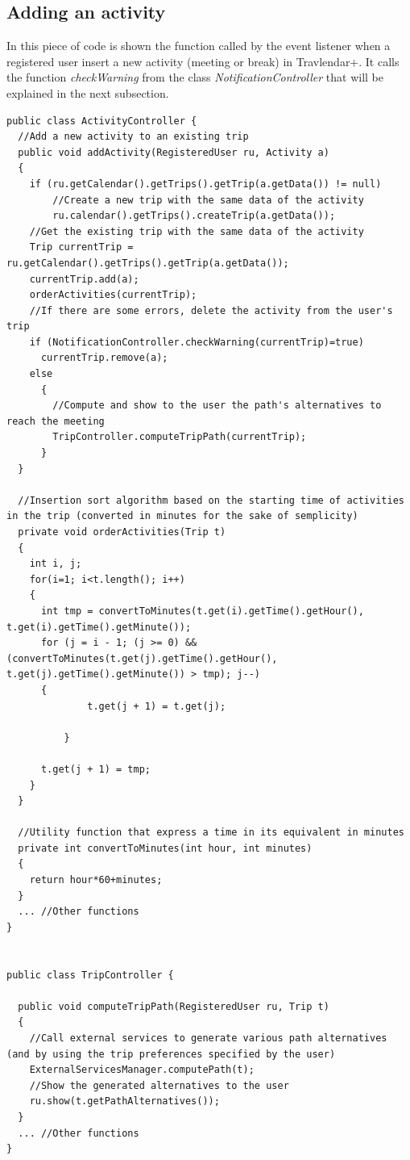 \documentclass[12pt,titlepage]{article}
\begin{document}
\subsection{Adding an activity} 
In this piece of code is shown the function called by the event listener when a registered user insert a new activity (meeting or break) in Travlendar+. It calls the function \textit{checkWarning} from the class \textit{NotificationController} that will be explained in the next subsection. 
\begin{lstlisting} 
public class ActivityController { 
  //Add a new activity to an existing trip 
  public void addActivity(RegisteredUser ru, Activity a) 
  { 
    if (ru.getCalendar().getTrips().getTrip(a.getData()) != null) 
        //Create a new trip with the same data of the activity 
        ru.calendar().getTrips().createTrip(a.getData());  
    //Get the existing trip with the same data of the activity 
    Trip currentTrip = ru.getCalendar().getTrips().getTrip(a.getData());  
    currentTrip.add(a); 
    orderActivities(currentTrip); 
    //If there are some errors, delete the activity from the user's trip 
    if (NotificationController.checkWarning(currentTrip)=true)  
      currentTrip.remove(a); 
    else  
      { 
        //Compute and show to the user the path's alternatives to reach the meeting 
        TripController.computeTripPath(currentTrip);  
      } 
  } 
   
  //Insertion sort algorithm based on the starting time of activities in the trip (converted in minutes for the sake of semplicity) 
  private void orderActivities(Trip t)  
  { 
    int i, j; 
    for(i=1; i<t.length(); i++) 
    { 
      int tmp = convertToMinutes(t.get(i).getTime().getHour(), t.get(i).getTime().getMinute()); 
      for (j = i - 1; (j >= 0) && (convertToMinutes(t.get(j).getTime().getHour(), t.get(j).getTime().getMinute()) > tmp); j--)  
      { 
              t.get(j + 1) = t.get(j); 
               
          } 
       
      t.get(j + 1) = tmp; 
    } 
  } 
   
  //Utility function that express a time in its equivalent in minutes  
  private int convertToMinutes(int hour, int minutes) 
  { 
    return hour*60+minutes; 
  } 
  ... //Other functions 
} 
 
 
public class TripController { 
 
  public void computeTripPath(RegisteredUser ru, Trip t) 
  { 
    //Call external services to generate various path alternatives (and by using the trip preferences specified by the user) 
    ExternalServicesManager.computePath(t); 
    //Show the generated alternatives to the user 
    ru.show(t.getPathAlternatives());  
  } 
  ... //Other functions  
} 
\end{lstlisting} 
 
\end{document}
